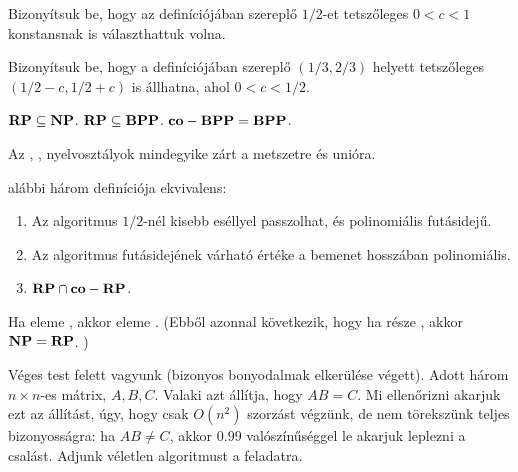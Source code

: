 \begin{Exercise}[counter={sorszam}, difficulty=0]
Bizonyítsuk be, hogy az \RP definíciójában szereplő $1/2$-et tetszőleges
$0<c<1$ konstansnak is választhattuk volna.
\end{Exercise}


\begin{Exercise}[counter={sorszam}, difficulty=0]
Bizonyítsuk be, hogy a \BPP definíciójában szereplő $(1/3,2/3)$ helyett
tetszőleges $(1/2-c,1/2+c)$ is állhatna, ahol $0<c<1/2$.
\end{Exercise}


\begin{Exercise}[counter={sorszam}, difficulty=0]
\easy $\mbox{\ensuremath{\mathbf{RP}}} \subseteq \mbox{\ensuremath{\mathbf{NP}}}$. $\mbox{\ensuremath{\mathbf{RP}}} \subseteq \mbox{\ensuremath{\mathbf{BPP}}}$. $\mbox{\ensuremath{\mathbf{co-BPP}}} = \mbox{\ensuremath{\mathbf{BPP}}}$.
\end{Exercise}


\begin{Exercise}[counter={sorszam}, difficulty=0]
Az \RP, \BPP, \ZPP nyelvosztályok mindegyike zárt a metszetre és unióra.
\end{Exercise}


\begin{Exercise}[counter={sorszam}, difficulty=0]
\ZPP alábbi három definíciója ekvivalens:
\begin{enumerate}
 \item Az algoritmus $1/2$-nél kisebb eséllyel passzolhat, és polinomiális futásidejű.
 \item Az algoritmus futásidejének várható értéke a bemenet hosszában polinomiális.
 \item $\mbox{\ensuremath{\mathbf{RP}}} \cap \mbox{\ensuremath{\mathbf{co-RP}}}$.
\end{enumerate}
\end{Exercise}


\begin{Exercise}[counter={sorszam}, difficulty=0]
Ha \SAT eleme \BPP, akkor \SAT eleme \RP. (Ebből azonnal
következik, hogy ha \NP része \BPP, akkor $\mbox{\ensuremath{\mathbf{NP}}}=\mbox{\ensuremath{\mathbf{RP}}}$. )
\end{Exercise}


\begin{Exercise}[counter={sorszam}, difficulty=0]
\easy Véges test felett vagyunk (bizonyos bonyodalmak elkerülése
végett). Adott három $n \times n$-es mátrix, $A,B,C$. Valaki azt állítja, hogy $AB=C$. Mi
ellenőrizni akarjuk ezt az állítást, úgy, hogy csak $O(n^2)$ szorzást végzünk,
de nem törekszünk teljes bizonyosságra: ha $AB \neq C$, akkor
$0.99$ valószínűséggel le akarjuk leplezni a csalást. Adjunk véletlen algoritmust
a feladatra.
\end{Exercise}


